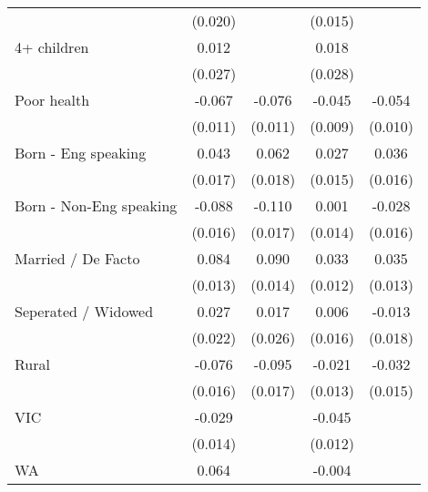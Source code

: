 {\begin{tabular}{l*{4}{c}}
                    &     (0.020)         &                     &     (0.015)         &                     \\
4+ children         &       0.012         &                     &       0.018         &                     \\
                    &     (0.027)         &                     &     (0.028)         &                     \\
Poor health         &      -0.067\sym{***}&      -0.076\sym{***}&      -0.045\sym{***}&      -0.054\sym{***}\\
                    &     (0.011)         &     (0.011)         &     (0.009)         &     (0.010)         \\
Born - Eng speaking &       0.043\sym{**} &       0.062\sym{***}&       0.027\sym{*}  &       0.036\sym{**} \\
                    &     (0.017)         &     (0.018)         &     (0.015)         &     (0.016)         \\
Born - Non-Eng speaking&      -0.088\sym{***}&      -0.110\sym{***}&       0.001         &      -0.028\sym{*}  \\
                    &     (0.016)         &     (0.017)         &     (0.014)         &     (0.016)         \\
Married / De Facto  &       0.084\sym{***}&       0.090\sym{***}&       0.033\sym{***}&       0.035\sym{***}\\
                    &     (0.013)         &     (0.014)         &     (0.012)         &     (0.013)         \\
Seperated / Widowed &       0.027         &       0.017         &       0.006         &      -0.013         \\
                    &     (0.022)         &     (0.026)         &     (0.016)         &     (0.018)         \\
Rural               &      -0.076\sym{***}&      -0.095\sym{***}&      -0.021\sym{*}  &      -0.032\sym{**} \\
                    &     (0.016)         &     (0.017)         &     (0.013)         &     (0.015)         \\
VIC                 &      -0.029\sym{**} &                     &      -0.045\sym{***}&                     \\
                    &     (0.014)         &                     &     (0.012)         &                     \\
WA                  &       0.064\sym{***}&                     &      -0.004         &                     \\

\end{tabular}}
